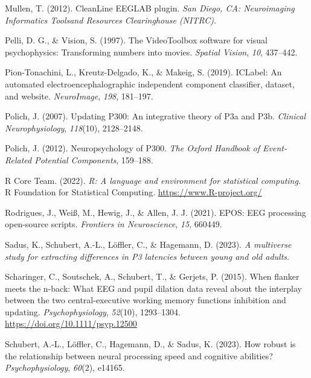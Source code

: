 \documentclass[
  man]{apa7}
\newlength{\cslhangindent}
\newlength{\cslentryspacingunit} %
\newenvironment{CSLReferences}[2] %
 {%
  \setlength{\parindent}{0pt}
  \ifodd #1
  \let\oldpar\par
  \def\par{\hangindent=\cslhangindent\oldpar}
  \fi
  \setlength{\parskip}{#2\cslentryspacingunit}
 }%
 {}
\begin{document}
\begin{CSLReferences}{1}{0}
\leavevmode{}%
Mullen, T. (2012). {CleanLine} {EEGLAB} plugin. \emph{San Diego, CA: Neuroimaging Informatics Toolsand Resources Clearinghouse (NITRC)}.

\leavevmode{}%
Pelli, D. G., \& Vision, S. (1997). The {VideoToolbox} software for visual psychophysics: {Transforming} numbers into movies. \emph{Spatial Vision}, \emph{10}, 437--442.

\leavevmode{}%
Pion-Tonachini, L., Kreutz-Delgado, K., \& Makeig, S. (2019). {ICLabel}: {An} automated electroencephalographic independent component classifier, dataset, and website. \emph{NeuroImage}, \emph{198}, 181--197.

\leavevmode{}%
Polich, J. (2007). Updating {P300}: An integrative theory of {P3a} and {P3b}. \emph{Clinical Neurophysiology}, \emph{118}(10), 2128--2148.

\leavevmode{}%
Polich, J. (2012). Neuropsychology of {P300}. \emph{The Oxford Handbook of Event-Related Potential Components}, 159--188.

\leavevmode{}%
R Core Team. (2022). \emph{R: A language and environment for statistical computing}. R Foundation for Statistical Computing. \url{https://www.R-project.org/}

\leavevmode{}%
Rodrigues, J., Weiß, M., Hewig, J., \& Allen, J. J. (2021). {EPOS}: {EEG} processing open-source scripts. \emph{Frontiers in Neuroscience}, \emph{15}, 660449.

\leavevmode{}%
Sadus, K., Schubert, A.-L., Löffler, C., \& Hagemann, D. (2023). \emph{A multiverse study for extracting differences in {P3} latencies between young and old adults}.

\leavevmode{}%
Scharinger, C., Soutschek, A., Schubert, T., \& Gerjets, P. (2015). When flanker meets the n-back: {What} {EEG} and pupil dilation data reveal about the interplay between the two central-executive working memory functions inhibition and updating. \emph{Psychophysiology}, \emph{52}(10), 1293--1304. \url{https://doi.org/10.1111/psyp.12500}

\leavevmode{}%
Schubert, A.-L., Löffler, C., Hagemann, D., \& Sadus, K. (2023). How robust is the relationship between neural processing speed and cognitive abilities? \emph{Psychophysiology}, \emph{60}(2), e14165.


\end{CSLReferences}
\end{document}
